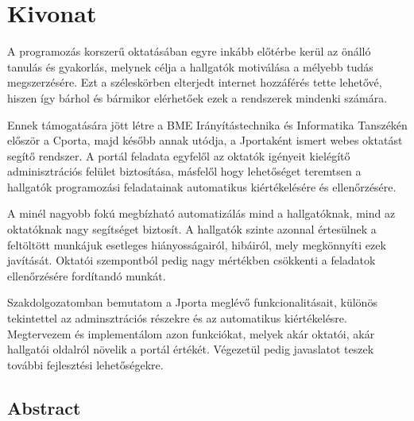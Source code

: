 \chapter*{Kivonat}%
A programozás korszerű oktatásában egyre inkább előtérbe kerül az önálló tanulás és gyakorlás, melynek célja a hallgatók motiválása a mélyebb tudás megszerzésére. Ezt a széleskörben elterjedt internet hozzáférés tette lehetővé, hiszen így bárhol és bármikor elérhetőek ezek a rendszerek mindenki számára.

Ennek támogatására jött létre a BME Irányítástechnika és Informatika Tanszékén először a Cporta, majd később annak utódja, a Jportaként ismert webes oktatást segítő rendszer. A portál feladata egyfelől az oktatók igényeit kielégítő adminisztrációs felület biztosítása, másfelől hogy lehetőséget teremtsen a hallgatók programozási feladatainak automatikus kiértékelésére és ellenőrzésére.

A minél nagyobb fokú megbízható automatizálás mind a hallgatóknak, mind az oktatóknak nagy segítséget biztosít. A hallgatók szinte azonnal értesülnek a feltöltött munkájuk esetleges hiányosságairól, hibáiról, mely megkönnyíti ezek javítását. Oktatói szempontból pedig nagy mértékben csökkenti a feladatok ellenőrzésére fordítandó munkát.

Szakdolgozatomban bemutatom a Jporta meglévő funkcionalitásait, különös tekintettel az adminsztrációs részekre és az automatikus kiértékelésre. Megtervezem és implementálom azon funkciókat, melyek akár oktatói, akár hallgatói oldalról növelik a portál értékét. Végezetül pedig javaslatot teszek további fejlesztési lehetőségekre.

\vfill

\begin{otherlanguage}{english}
\chapter*{Abstract}%


\end{otherlanguage}
\vfill

